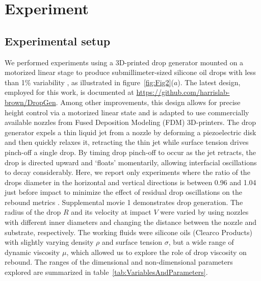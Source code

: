 \documentclass{jfm}
\begin{document}
\section{Experiment}\label{sec:experiment}

\subsection{Experimental setup}

We performed experiments using a 3D-printed drop generator mounted on a motorized linear stage to produce submillimeter-sized silicone oil drops with less than 1\% variability \citep{harris2015low,ionkin2018note}, as illustrated in figure~\ref{fig:Fig2}($a$). The latest design, employed for this work, is documented at \url{https://github.com/harrislab-brown/DropGen}. Among other improvements, this design allows for precise height control via a motorized linear state and is adapted to use commercially available nozzles from Fused Deposition Modeling (FDM) 3D-printers. The drop generator expels a thin liquid jet from a nozzle by deforming a piezoelectric disk and then quickly relaxes it, retracting the thin jet while surface tension drives pinch-off a single drop. By timing drop pinch-off to occur as the jet retracts, the drop is directed upward and `floats' momentarily, allowing interfacial oscillations to decay considerably. Here, we report only experiments where the ratio of the drops diameter in the horizontal and vertical directions is between 0.96 and 1.04 just before impact to minimize the effect of residual drop oscillations on the rebound metrics \citep{biance2006elasticity,yun2019spreading}. Supplemental movie 1 demonstrates drop generation. The radius of the drop $R$ and its velocity at impact $V$ were varied by using nozzles with different inner diameters and changing the distance between the nozzle and substrate, respectively. The working fluids were silicone oils (Clearco Products) with slightly varying density $\rho$ and surface tension $\sigma$, but a wide range of dynamic viscosity $\mu$, which allowed us to explore the role of drop viscosity on rebound. The ranges of the dimensional and non-dimensional parameters explored are summarized in table~\ref{tab:VariablesAndParameters}.
 
\end{document}
